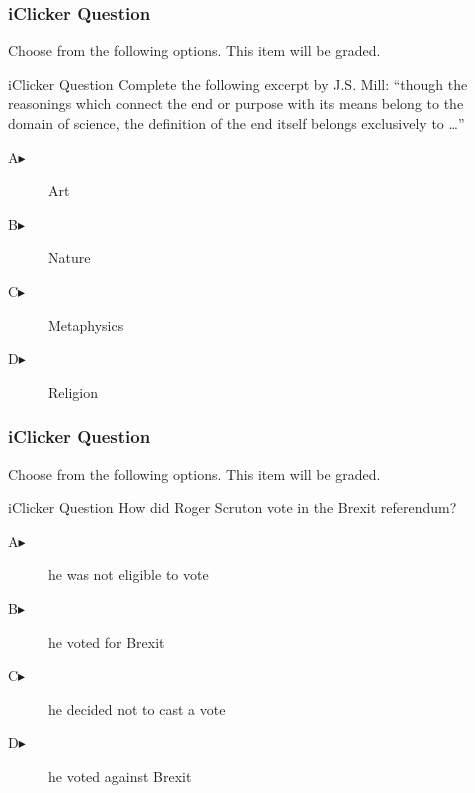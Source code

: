 \documentclass[xcolor=dvipsnames]{beamer}
\begin{document}
\begin{frame}
  \frametitle{iClicker Question}
Choose from the following options. This item will be graded.
\begin{block}{iClicker Question}
Complete the following excerpt by J.S. Mill: ``though the reasonings
which connect the end or purpose with its means belong to the
domain of science, the definition of the end itself belongs
exclusively to {\ldots}''
\end{block}
\begin{description}
\item[A\hspace{.2in}$\blacktriangleright$] Art
\item[B\hspace{.2in}$\blacktriangleright$] Nature
\item[C\hspace{.2in}$\blacktriangleright$] Metaphysics
\item[D\hspace{.2in}$\blacktriangleright$] Religion
\end{description}
\end{frame}

\begin{frame}
  \frametitle{iClicker Question}
Choose from the following options. This item will be graded.
\begin{block}{iClicker Question}
  How did Roger Scruton vote in the Brexit referendum?
\end{block}
\begin{description}
\item[A\hspace{.2in}$\blacktriangleright$] he was not eligible to vote
\item[B\hspace{.2in}$\blacktriangleright$] he voted for Brexit
\item[C\hspace{.2in}$\blacktriangleright$] he decided not to cast a vote
\item[D\hspace{.2in}$\blacktriangleright$] he voted against Brexit
\end{description}
\end{frame}
\end{document}
